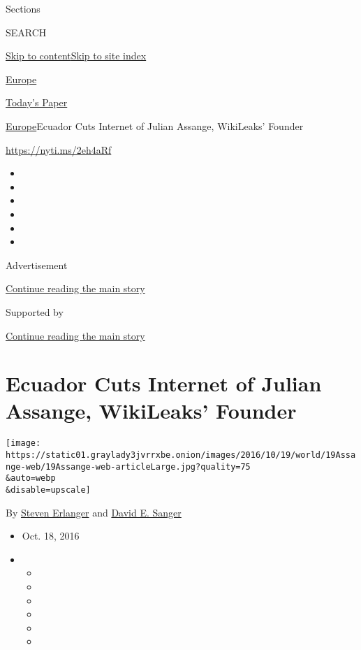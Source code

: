 Sections

SEARCH

\protect\hyperlink{site-content}{Skip to
content}\protect\hyperlink{site-index}{Skip to site index}

\href{https://www.nytimes3xbfgragh.onion/section/world/europe}{Europe}

\href{https://myaccount.nytimes3xbfgragh.onion/auth/login?response_type=cookie\&client_id=vi}{}

\href{https://www.nytimes3xbfgragh.onion/section/todayspaper}{Today's
Paper}

\href{/section/world/europe}{Europe}\textbar{}Ecuador Cuts Internet of
Julian Assange, WikiLeaks' Founder

\url{https://nyti.ms/2eh4aRf}

\begin{itemize}
\item
\item
\item
\item
\item
\item
\end{itemize}

Advertisement

\protect\hyperlink{after-top}{Continue reading the main story}

Supported by

\protect\hyperlink{after-sponsor}{Continue reading the main story}

\hypertarget{ecuador-cuts-internet-of-julian-assange-wikileaks-founder}{%
\section{Ecuador Cuts Internet of Julian Assange, WikiLeaks'
Founder}\label{ecuador-cuts-internet-of-julian-assange-wikileaks-founder}}

\texttt{[image: https://static01.graylady3jvrrxbe.onion/images/2016/10/19/world/19Assange-web/19Assange-web-articleLarge.jpg?quality=75\\\&auto=webp\\\&disable=upscale]}

By \href{http://www.nytimes3xbfgragh.onion/by/steven-erlanger}{Steven
Erlanger} and
\href{http://www.nytimes3xbfgragh.onion/by/david-e-sanger}{David E.
Sanger}

\begin{itemize}
\item
  Oct. 18, 2016
\item
  \begin{itemize}
  \item
  \item
  \item
  \item
  \item
  \item
  \end{itemize}
\end{itemize}

